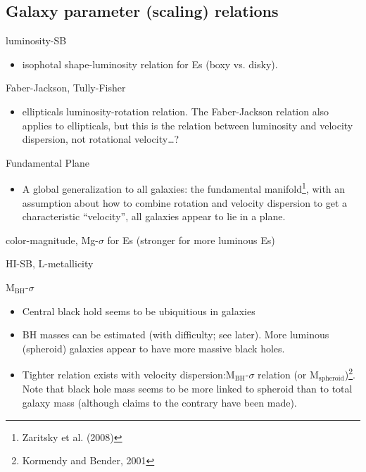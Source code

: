 \documentclass{article}
\newcommand{\mynotes}[1]{\textcolor{cadmiumgreen}{#1}}
\begin{document}
\subsection{Galaxy parameter (scaling) relations}
\begin{description}[labelindent=0.2in]
    \item [Structural] luminosity-SB
        \begin{itemize}
            \item isophotal shape-luminosity relation for Es
                (boxy vs. disky).
        \end{itemize}
    \item [Kinematic] Faber-Jackson, Tully-Fisher
        \begin{itemize}
            \item ellipticals luminosity-rotation relation.
                \mynotes{The Faber-Jackson relation also applies to
                ellipticals, but this is the relation between luminosity
                and velocity dispersion, not rotational velocity\ldots?}
        \end{itemize}
    \item [Structural/kinematic] Fundamental Plane
        \begin{itemize}
            \item A global generalization to all galaxies: the fundamental
                manifold\footnote{Zaritsky et al. (2008)}, with an
                assumption about how to combine rotation and velocity
                dispersion to get a characteristic ``velocity'', all galaxies
                appear to lie in a plane.
        \end{itemize}
    \item [Stellar populations] color-magnitude, Mg-$\sigma$ for Es
        (stronger for more luminous Es)
    \item [Gas] HI-SB, L-metallicity
    \item [Black holes] M$_{\mathrm{BH}}$-$\sigma$
        \begin{itemize}
            \item Central black hold seems to be ubiquitious in galaxies
            \item BH masses can be estimated (with difficulty; see later).
                More luminous (spheroid) galaxies appear to have more
                massive black holes.
            \item Tighter relation exists with velocity
                dispersion:M$_{\mathrm{BH}}$-$\sigma$ relation
                (or M$_{\mathrm{spheroid}}$)\footnote{Kormendy and
                Bender, 2001}. Note that black hole mass seems to be
                more linked to spheroid than to total galaxy mass
                (although claims to the contrary have been made).
        \end{itemize}
\end{description}
\end{document}
